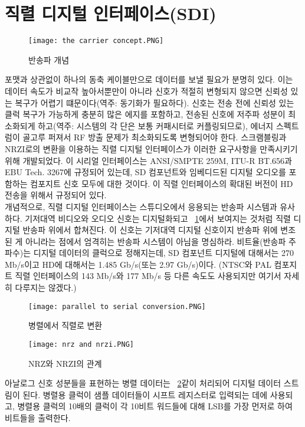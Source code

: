 \section{직렬 디지털 인터페이스(SDI)}
\begin{figure}
    \centering
    \texttt{[image: the carrier concept.PNG]}
    \caption{반송파 개념}\label{fig:the carrier concept}
\end{figure}
포맷과 상관없이 하나의 동축 케이블만으로 데이터를 보낼 필요가 분명히 있다. 이는 데이터 속도가 비교작 높아서뿐만이 아니라 신호가 적절히 변형되지 않으면 신뢰성 있는 복구가 어렵기 떄문이다(역주: 동기화가 필요하다).
신호는 전송 전에 신뢰성 있는 클럭 복구가 가능하게 충분히 많은 에지를 포함하고, 전송된 신호에 저주파 성분이 최소화되게 하고(역주: 시스템의 각 단은 보통 커패시터로 커플링되므로), 에너지 스펙트럼이 골고루 퍼져서 RF 방출 문제가 최소화되도록 변형되어야 한다.
스크램블링과 NRZI로의 변환을 이용하는 직렬 디지털 인터페이스가 이러한 요구사항을 만족시키기 위해 개발되었다. 이 시리얼 인터페이스는 ANSI/SMPTE 259M, ITU-R BT.656과 EBU Tech. 3267에 규정되어 있는데, SD 컴포넌트와 임베디드된 디지털 오디오를 포함하는 컴포지트 신호 모두에 대한 것이다.
이 직렬 인터페이스의 확대된 버전이 HD 전송을 위해서 규정되어 있다.
\\
개념적으로, 직렬 디지털 인터페이스는 스튜디오에서 응용되는 반송파 시스템과 유사하다. 기저대역 비디오와 오디오 신호는 디지털화되고 \figurename~\ref{fig:the carrier concept}에서 보여지는 것처럼 직렬 디지털 반송파 위에서 합쳐진다.
이 신호는 기저대역 디지털 신호이지 반송파 위에 변조된 게 아니라는 점에서 엄격히는 반송파 시스템이 아님을 명심하라.
비트율(반송파 주파수)는 디지털 데이터의 클럭으로 정해지는데, SD 컴포넌트 디지털에 대해서는 270 Mb/s이고 HD에 대해서는 1.485 Gb/s(또는 2.97 Gb/s)이다. (NTSC와 PAL 컴포지트 직렬 인터페이스의 143 Mb/s와 177 Mb/s 등 다른 속도도 사용되지만 여기서 자세히 다루지는 않겠다.)\
\\
\begin{figure}
    \centering
    \texttt{[image: parallel to serial conversion.PNG]}
    \caption{병렬에서 직렬로 변환}\label{fig:parallel to serial conv}
\end{figure}
\begin{figure}
    \centering
    \texttt{[image: nrz and nrzi.PNG]}
    \caption{NRZ와 NRZI의 관계}\label{fig:nrz and nrzi}
\end{figure}
아날로그 신호 성분들을 표현하는 병렬 데이터는 \figurename~\ref{fig:parallel to serial conv}\와 같이 처리되어 디지털 데이터 스트림이 된다. 병렬용 클럭이 샘플 데이터들이 시프트 레지스터로 입력되는 데에 사용되고, 병렬용 클럭의 10배의 클럭이 각 10비트 워드들에 대해 LSB를 가장 먼저로 하여 비트들을 출력한다.
